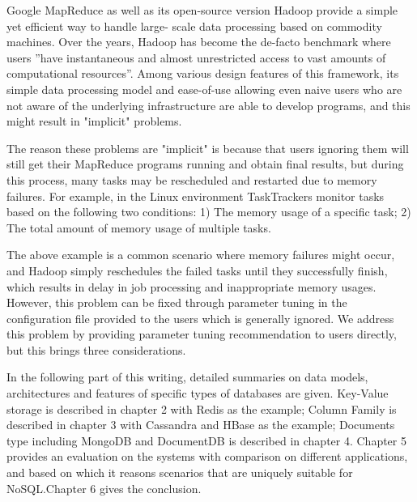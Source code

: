 Google MapReduce as well as its open-source version Hadoop provide a simple yet efficient way to handle large- scale data processing based on commodity machines.
Over the years, Hadoop has become the de-facto benchmark\cite{hayashibara2004varphi} where users ”have instantaneous and almost unrestricted access to vast amounts of computational resources”.
Among various design features of this framework, its simple data processing model and ease-of-use allowing even naive users who are not aware of the underlying infrastructure are able to develop programs, and this might result in "implicit" problems.
\par
The reason these problems are "implicit" is because that users ignoring them will still get their MapReduce programs running and obtain final results, but during this process, many tasks may be rescheduled and restarted due to memory failures. 
For example, in the Linux environment TaskTrackers monitor tasks based on the following two conditions:  1) The memory usage of a specific task; 2) The total amount of memory usage of multiple tasks. 
\par

The above example is a common scenario where memory failures might occur, and Hadoop simply reschedules the failed tasks until they successfully finish, which results in delay in job processing and inappropriate memory usages.
However, this problem can be fixed through parameter tuning in the configuration file provided to the users which is generally ignored.
We address this problem by providing parameter tuning recommendation to users directly, but this brings three considerations. 
\par

In the following part of this writing, detailed summaries on data models, architectures and features of specific types of databases are given. Key-Value storage is described in chapter 2 with Redis as the example; Column Family is described in chapter 3 with Cassandra and HBase as the example; Documents type including MongoDB and DocumentDB is described in chapter 4. Chapter 5 provides an evaluation on the systems with comparison on different applications, and based on which it reasons scenarios that are uniquely suitable for NoSQL.Chapter 6 gives the conclusion.


